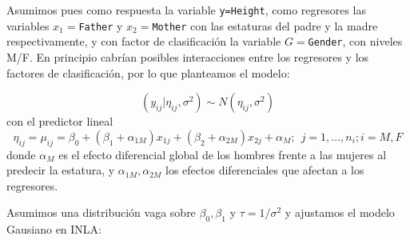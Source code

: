 \documentclass[
]{book}
\newenvironment{Shaded}{\begin{snugshade}}{\end{snugshade}}
\newcommand{\AttributeTok}[1]{\textcolor[rgb]{0.77,0.63,0.00}{#1}}
\newcommand{\CommentTok}[1]{\textcolor[rgb]{0.56,0.35,0.01}{\textit{#1}}}
\newcommand{\DecValTok}[1]{\textcolor[rgb]{0.00,0.00,0.81}{#1}}
\newcommand{\FunctionTok}[1]{\textcolor[rgb]{0.00,0.00,0.00}{#1}}
\newcommand{\NormalTok}[1]{#1}
\newcommand{\OtherTok}[1]{\textcolor[rgb]{0.56,0.35,0.01}{#1}}
\newcommand{\SpecialCharTok}[1]{\textcolor[rgb]{0.00,0.00,0.00}{#1}}
\newcommand{\StringTok}[1]{\textcolor[rgb]{0.31,0.60,0.02}{#1}}
\begin{document}
Asumimos pues como respuesta la variable \texttt{y=Height}, como regresores las variables \(x_1=\)\texttt{Father} y \(x_2=\)\texttt{Mother} con las estaturas del padre y la madre respectivamente, y con factor de clasificación la variable \(G=\)\texttt{Gender}, con niveles M/F. En principio cabrían posibles interacciones entre los regresores y los factores de clasificación, por lo que planteamos el modelo:

\[(y_{ij}|\eta_{ij},\sigma^2) \sim N(\eta_{ij},\sigma^2)\]
con el predictor lineal
\[\eta_{ij}=\mu_{ij}=\beta_0+(\beta_1 + \alpha_{1M}) x_{1j} + (\beta_2+ \alpha_{2M}) x_{2j} + \alpha_M;\ \  j =1,...,n_i; i=M,F\]
donde \(\alpha_M\) es el efecto diferencial global de los hombres frente a las mujeres al predecir la estatura, y \(\alpha_{1M},\alpha_{2M}\) los efectos diferenciales que afectan a los regresores.

Asumimos una distribución vaga sobre \(\beta_0, \beta_1\) y \(\tau=1/\sigma^2\) y ajustamos el modelo Gausiano en INLA:

\begin{Shaded}
\end{Shaded}
\end{document}
